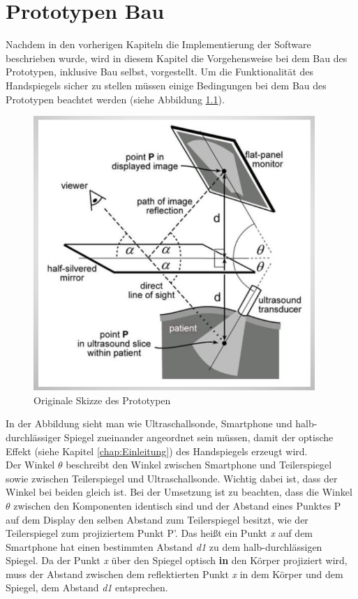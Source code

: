 \chapter{Prototypen Bau}\label{chap:Prototypen_Bau}
Nachdem in den vorherigen Kapiteln die Implementierung der Software beschrieben wurde, wird in diesem Kapitel die Vorgehensweise bei dem Bau des Prototypen, inklusive Bau selbst, vorgestellt. Um die Funktionalität des Handspiegels sicher zu stellen müssen einige Bedingungen bei dem Bau des Prototypen beachtet werden (siehe Abbildung \ref{fig:protoyp_skizze_ori}).
\begin{figure}[h]
	\centering
	\includegraphics[width=0.95\textwidth]{Prototypen_Bau/Sketch1}
	\caption{Originale Skizze des Prototypen}
	\label{fig:protoyp_skizze_ori}
\end{figure}
In der Abbildung sieht man wie Ultraschallsonde, Smartphone und halb-durchlässiger Spiegel zueinander angeordnet sein müssen, damit der optische Effekt (siehe Kapitel \ref{chap:Einleitung}) des Handspiegels erzeugt wird.\\
Der Winkel $\theta$ beschreibt den Winkel zwischen Smartphone und Teilerspiegel sowie zwischen Teilerspiegel und Ultraschallsonde. Wichtig dabei ist, dass der Winkel bei beiden gleich ist. Bei der Umsetzung ist zu beachten, dass die Winkel $\theta$ zwischen den Komponenten identisch sind und der Abstand eines Punktes P auf dem Display den selben Abstand zum Teilerspiegel besitzt, wie der  Teilerspiegel zum projiziertem Punkt P'. Das heißt ein Punkt \textit{x} auf dem Smartphone hat einen bestimmten Abstand \textit{d1} zu dem halb-durchlässigen Spiegel. Da der Punkt \textit{x} über den Spiegel optisch \textbf{in} den Körper projiziert wird, muss der Abstand zwischen dem reflektierten Punkt \textit{x} in dem Körper und dem Spiegel, dem Abstand \textit{d1} entsprechen.\\
